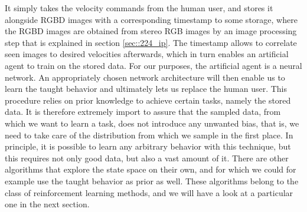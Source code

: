 It simply takes the velocity commands from the human user, and stores it alongside RGBD images with a corresponding timestamp to some storage, where the RGBD images are obtained from stereo RGB images by an image processing step that is explained in section \ref{sec::224_ip}. The timestamp allows to correlate seen images to desired velocities afterwards, which in turn enables an artificial agent to train on the stored data. For our purposes, the artificial agent is a neural network. An appropriately chosen network architecture will then enable us to learn the taught behavior and ultimately lets us replace the human user. This procedure relies on prior knowledge to achieve certain tasks, namely the stored data. It is therefore extremely import to assure that the sampled data, from which we want to learn a task, does not introduce any unwanted bias, that is, we need to take care of the distribution from which we sample in the first place. In principle, it is possible to learn any arbitrary behavior with this technique, but this requires not only good data, but also a vast amount of it. There are other algorithms that explore the state space on their own, and for which we could for example use the taught behavior as prior as well. These algorithms belong to the class of reinforcement learning methods, and we will have a look at a particular one in the next section.